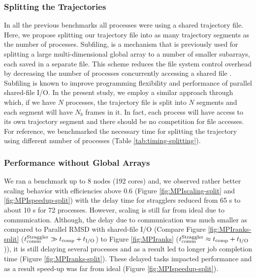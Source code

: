 \subsubsection{Splitting the Trajectories}
\label{splitting-traj}
In all the previous benchmarks all processes were using a shared trajectory file.
Here, we propose splitting our trajectory file into as many trajectory segments as the number of processes.
Subfiling, is a mechanism that is previously used for splitting a large multi-dimensional global array to a number of smaller subarrays, each saved in a separate file. 
This scheme reduces the file system control overhead by decreasing the number of processes concurrently accessing a shared file \cite{scalable-IO, scalable-IO1}.
Subfiling is known to improve programming flexibility and performance of parallel shared-file I/O. 
In the present study, we employ a similar approach through which, if we have $N$ processes, the trajectory file is split into $N$ segments and each segment will have $N_{b}$ frames in it. 
In fact, each process will have access to its own trajectory segment and there should be no competition for file accesses. 
For reference, we benchmarked the necessary time for splitting the trajectory using different number of processes (Table \ref{tab:timing-splitting}).

\subsubsection*{Performance without Global Arrays}
We ran a benchmark up to 8 nodes (192 cores) and, we observed rather better scaling behavior with efficiencies above 0.6 (Figure \ref{fig:MPIscaling-split} and \ref{fig:MPIspeedup-split}) with the delay time for stragglers reduced from 65 s to about 10 s for 72 processes. 
However, scaling is still far from ideal due to communication. 
Although, the delay due to communication was much smaller as compared to Parallel RMSD with shared-file I/O (Compare Figure \ref{fig:MPIranks-split} ($t_{\text{comm}}^{\text{Straggler}} \gg {t}_{\text{comp}}+{t}_{\text{I/O}}$) to Figure \ref{fig:MPIranks} ($t_{\text{comm}}^{\text{Straggler}} \approx {t}_{\text{comp}}+{t}_{\text{I/O}}$)), it is still delaying several processes and as a result led to longer job completion time (Figure \ref{fig:MPIranks-split}). 
These delayed tasks impacted performance and as a result speed-up was far from ideal (Figure \ref{fig:MPIspeedup-split}).

